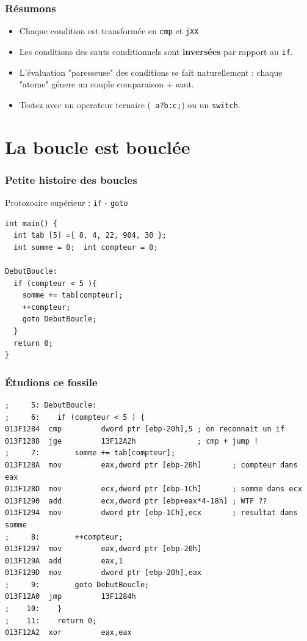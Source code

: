 \documentclass{beamer}
\begin{document}
\begin{frame}
\frametitle{Résumons}
\begin{itemize}
\item Chaque condition est transformée en \texttt{cmp} et \texttt{jXX}
\item Les conditions des sauts conditionnels sont \textbf{inversées} par rapport au \texttt{if}.
\item L'évaluation "paresseuse" des conditions se fait naturellement : chaque "atome" génere un couple comparaison + saut.
\item Testez avec un operateur ternaire (\texttt{ a?b:c;}) ou un \lstinline+switch+.
\end{itemize}
\end{frame}



\section{La boucle est bouclée}
\begin{frame}[fragile]
\frametitle{Petite histoire des boucles}
Protozoaire supérieur : \lstinline+if+ - \lstinline+goto+
\begin{lstlisting}
int main() {
  int tab [5] ={ 8, 4, 22, 904, 30 };
  int somme = 0;  int compteur = 0;

DebutBoucle:
  if (compteur < 5 ){
    somme += tab[compteur];
    ++compteur;
    goto DebutBoucle;
  }
  return 0;
}
\end{lstlisting}
\end{frame}

\begin{frame}[fragile]
\frametitle{Étudions ce fossile}
\begin{lstlisting}[language={[x86masm]Assembler}, basicstyle={\scriptsize\ttfamily}]
;     5: DebutBoucle:
;     6: 	if (compteur < 5 ) {
013F1284  cmp         dword ptr [ebp-20h],5 ; on reconnait un if
013F1288  jge         13F12A2h              ; cmp + jump !
;     7: 		somme += tab[compteur];
013F128A  mov         eax,dword ptr [ebp-20h]       ; compteur dans eax
013F128D  mov         ecx,dword ptr [ebp-1Ch]       ; somme dans ecx
013F1290  add         ecx,dword ptr [ebp+eax*4-18h] ; WTF ?? 
013F1294  mov         dword ptr [ebp-1Ch],ecx       ; resultat dans somme
;     8: 		++compteur;
013F1297  mov         eax,dword ptr [ebp-20h]  
013F129A  add         eax,1  
013F129D  mov         dword ptr [ebp-20h],eax  
;     9: 		goto DebutBoucle;
013F12A0  jmp         13F1284h  
;    10: 	}
;    11: 	return 0;
013F12A2  xor         eax,eax  
\end{lstlisting}
\end{frame}
\end{document}

